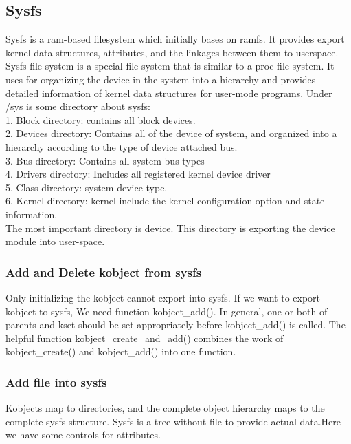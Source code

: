 \documentclass[10pt,draftclsnofoot,peerreview ,letterpaper,onecolumn,]{IEEEtran}
\begin{document}
	\subsection{Sysfs}
	Sysfs is a ram-based filesystem which initially bases on ramfs. It provides export kernel data structures, attributes, and the linkages between them to userspace. Sysfs file system is a special file system that is similar to a proc file system. It uses for organizing the device in the system into a hierarchy and provides detailed information of kernel data structures for user-mode programs. Under /sys is some directory about sysfs: \\
		1. Block directory: contains all block devices. \\
		2. Devices directory: Contains all of the device of system, and organized into a hierarchy according to the type of device attached bus.\\
		3. Bus directory: Contains all system bus types \\
		4. Drivers directory: Includes all registered kernel device driver \\
		5. Class directory: system device type. \\
		6. Kernel directory: kernel include the kernel configuration option and state information. \\
	The most important directory is device. This directory is exporting the device module into user-space.\\
	
	\subsubsection{Add and Delete kobject from sysfs}
	Only initializing the kobject cannot export into sysfs. If we want to export kobject to sysfs, We need function kobject\_add(). In general, one or both of parents and kset should be set appropriately before kobject\_add() is called. The helpful function kobject\_create\_and\_add() combines the work of kobject\_create() and kobject\_add() into one function.
	
	\subsubsection{Add file into sysfs}
	Kobjects map to directories, and the complete object hierarchy maps to the complete sysfs structure. Sysfs is a tree without file to provide actual data.\newline Here we have some controls for attributes. \\
\end{document}

